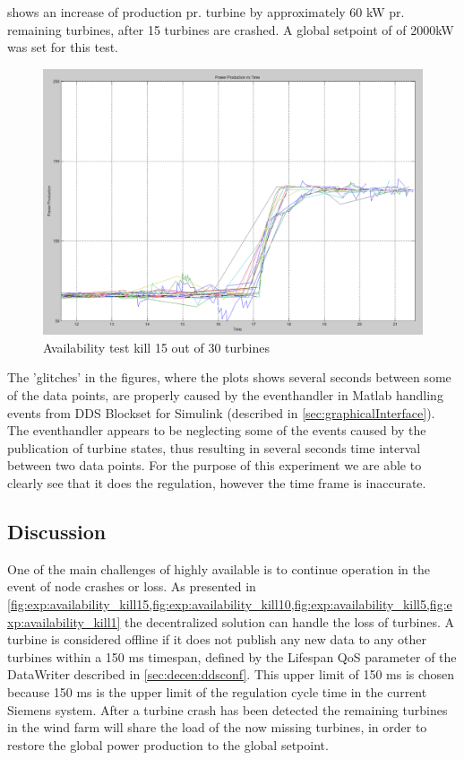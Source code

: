 \FloatBarrier
{} shows an increase of production pr. turbine by approximately 60 kW pr. remaining turbines, after 15 turbines are crashed. A global setpoint of of 2000kW was set for this test.

\begin{figure}[!h]
	\centering
	\includegraphics[width=\resultsFigureWidthScale\textwidth]{figures/Results/availabilitytest30-15_setpoint_2000.PNG}
	\caption{Availability test kill 15 out of 30 turbines}
	\label{fig:exp:availability_kill15}
\end{figure}

\FloatBarrier

The 'glitches' in the figures, where the plots shows several seconds between some of the data points, are properly caused by the eventhandler in Matlab handling events from DDS Blockset for Simulink (described in \cref{sec:graphicalInterface}). The eventhandler appears to be neglecting some of the events caused by the publication of turbine states, thus resulting in several seconds time interval between two data points. For the purpose of this experiment we are able to clearly see that it does the regulation, however the time frame is inaccurate.

\subsection{Discussion}
One of the main challenges of highly available is to continue operation in the event of node crashes or loss. As presented in  \cref{fig:exp:availability_kill15,fig:exp:availability_kill10,fig:exp:availability_kill5,fig:exp:availability_kill1} the decentralized solution can handle the loss of turbines. A turbine is considered offline if it does not publish any new data to any other turbines within a 150 ms timespan, defined by the Lifespan QoS parameter of the DataWriter described in \cref{sec:decen:ddsconf}.
This upper limit of 150 ms is chosen because 150 ms is the upper limit of the regulation cycle time in the current Siemens system.
After a turbine crash has been detected the remaining turbines in the wind farm will share the load of the now missing turbines, in order to restore the global power production to the global setpoint.

